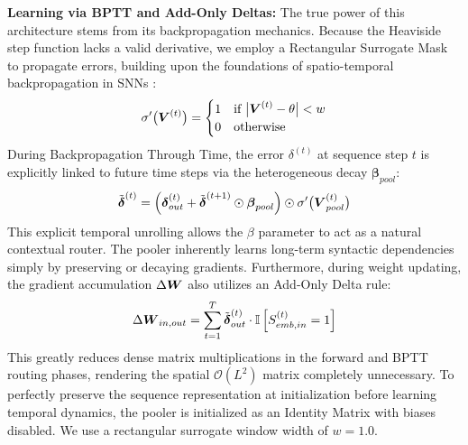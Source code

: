 \documentclass[10pt]{article} %
\begin{document}
\textbf{Learning via BPTT and Add-Only Deltas:} The true power of this architecture stems from its backpropagation mechanics. Because the Heaviside step function lacks a valid derivative, we employ a Rectangular Surrogate Mask to propagate errors, building upon the foundations of spatio-temporal backpropagation in SNNs \citep{neftci2019surrogate}:
\begin{equation}
\sigma'\big(\boldsymbol{V}^{(t)}\big) = \begin{cases} 1 & \text{if } \big|\boldsymbol{V}^{(t)} - \theta\big| < w \\ 0 & \text{otherwise} \end{cases}
\end{equation}
During Backpropagation Through Time, the error $\delta^{(t)}$ at sequence step $t$ is explicitly linked to future time steps via the heterogeneous decay $\bm{\beta}_{pool}$:
\begin{equation}
\tilde{\boldsymbol{\delta}}^{(t)} = \left( \boldsymbol{\delta}_{out}^{(t)} + \tilde{\boldsymbol{\delta}}^{(t+1)} \odot \boldsymbol{\beta}_{pool} \right) \odot \sigma'\big(\boldsymbol{V}_{pool}^{(t)}\big)
\end{equation}
This explicit temporal unrolling allows the $\beta$ parameter to act as a natural contextual router. The pooler inherently learns long-term syntactic dependencies simply by preserving or decaying gradients. Furthermore, during weight updating, the gradient accumulation $\Delta \boldsymbol{W}$ also utilizes an Add-Only Delta rule:
\begin{equation}
\Delta \boldsymbol{W}_{in, out} = \sum_{t=1}^{T} \tilde{\boldsymbol{\delta}}^{(t)}_{out} \cdot \mathbb{I}\left[ S_{emb, in}^{(t)} = 1 \right]
\end{equation}
This greatly reduces dense matrix multiplications in the forward and BPTT routing phases, rendering the spatial $\mathcal{O}(L^2)$ matrix completely unnecessary. To perfectly preserve the sequence representation at initialization before learning temporal dynamics, the pooler is initialized as an Identity Matrix with biases disabled. We use a rectangular surrogate window width of $w=1.0$.
\end{document}

